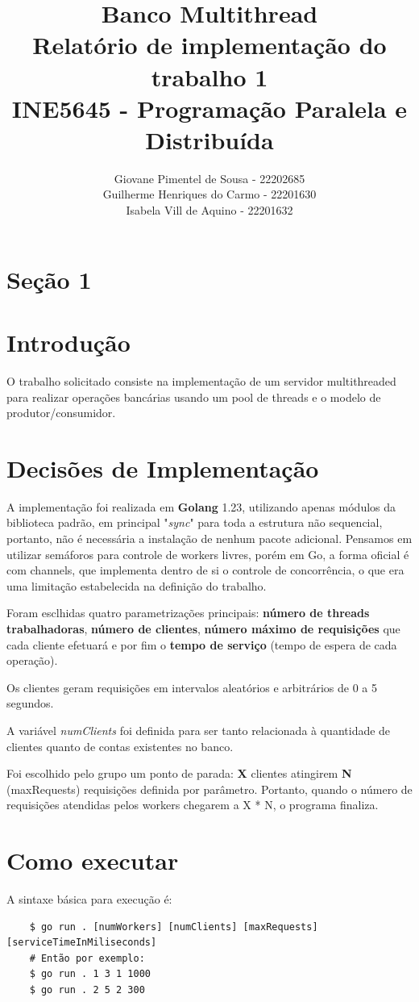 \documentclass{article}
\title{
	Banco Multithread\\
	\large Relatório de implementação do trabalho 1\\INE5645 - Programação Paralela e Distribuída
}
\author{Giovane Pimentel de Sousa - 22202685\\
		Guilherme Henriques do Carmo - 22201630\\
		Isabela Vill de Aquino - 22201632
}
\begin{document}
\maketitle
\section*{Seção 1}
\section*{Introdução}
O trabalho solicitado consiste na implementação de um servidor multithreaded para realizar operações bancárias usando um pool de threads e o modelo de produtor/consumidor.

\section*{Decisões de Implementação}
A implementação foi realizada em \textbf{Golang} 1.23, utilizando apenas módulos da biblioteca padrão, em principal "\textit{sync}"
para toda a estrutura não sequencial, portanto, não é necessária a instalação de nenhum pacote adicional. Pensamos
em utilizar semáforos para controle de workers livres, porém em Go, a forma oficial é com channels, que implementa
dentro de si o controle de concorrência, o que era uma limitação estabelecida na definição do trabalho.

Foram esclhidas quatro parametrizações principais:
\textbf{número de threads trabalhadoras}, \textbf{número de clientes}, \textbf{número máximo de requisições}
que cada cliente efetuará e por fim o \textbf{tempo de serviço} (tempo de espera de cada operação).

Os clientes geram requisições em intervalos aleatórios e arbitrários de 0 a 5 segundos.

A variável \textit{numClients} foi definida para ser tanto relacionada à quantidade de clientes quanto de contas existentes no banco.

Foi escolhido pelo grupo um ponto de parada: \textbf{X} clientes atingirem \textbf{N} (maxRequests) requisições definida por parâmetro.
Portanto, quando o número de requisições atendidas pelos workers chegarem a X * N, o programa finaliza.

\section*{Como executar}
A sintaxe básica para execução é:
\begin{lstlisting}
	$ go run . [numWorkers] [numClients] [maxRequests] [serviceTimeInMiliseconds]
	# Então por exemplo:	
	$ go run . 1 3 1 1000
	$ go run . 2 5 2 300
\end{lstlisting}
\end{document}
